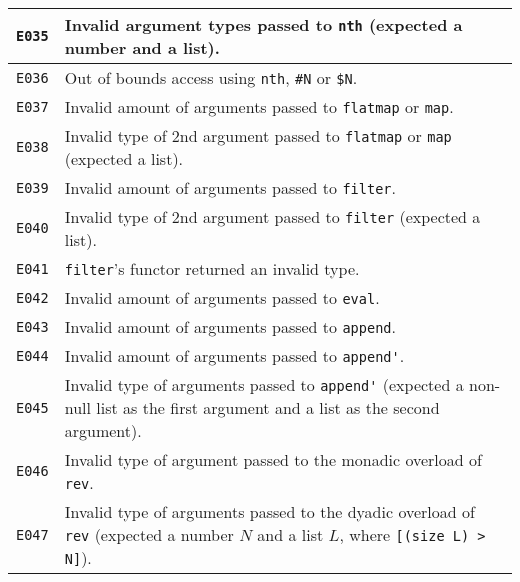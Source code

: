 \begin{longtable}{ | p{6em} | p{34em} | }
\verb|E035|          & Invalid argument types passed to \verb|nth| (expected a number and a list).                                                                    \\ \hline
\verb|E036|          & Out of bounds access using \verb|nth|, \verb|#N| or \verb|$N|.                                                                                 \\ \hline
\verb|E037|          & Invalid amount of arguments passed to \verb|flatmap| or \verb|map|.                                                                            \\ \hline
\verb|E038|          & Invalid type of 2nd argument passed to \verb|flatmap| or \verb|map| (expected a list).                                                         \\ \hline
\verb|E039|          & Invalid amount of arguments passed to \verb|filter|.                                                                                           \\ \hline
\verb|E040|          & Invalid type of 2nd argument passed to \verb|filter| (expected a list).                                                                        \\ \hline
\verb|E041|          & \verb|filter|'s functor returned an invalid type.                                                                                              \\ \hline
\verb|E042|          & Invalid amount of arguments passed to \verb|eval|.                                                                                             \\ \hline
\verb|E043|          & Invalid amount of arguments passed to \verb|append|.                                                                                           \\ \hline
\verb|E044|          & Invalid amount of arguments passed to \verb|append'|.                                                                                          \\ \hline
\verb|E045|          & Invalid type of arguments passed to \verb|append'| (expected a non-null list as the first argument and a list as the second argument).         \\ \hline
\verb|E046|          & Invalid type of argument passed to the monadic overload of \verb|rev|.                                                                         \\ \hline
\verb|E047|          & Invalid type of arguments passed to the dyadic overload of \verb|rev| (expected a number $N$ and a list $L$, where \verb|[(size L) > N]|).     \\ \hline

\end{longtable}
